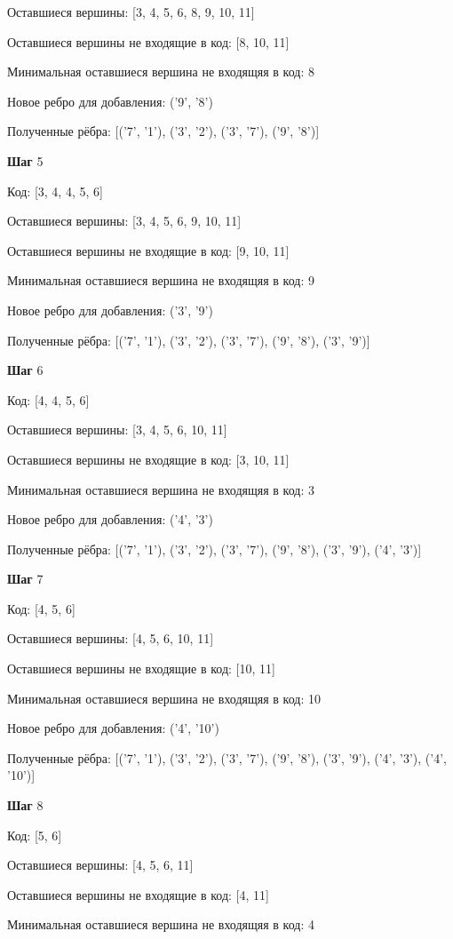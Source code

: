 Оставшиеся вершины: [3, 4, 5, 6, 8, 9, 10, 11]

Оставшиеся вершины не входящие в код: [8, 10, 11]

Минимальная оставшиеся вершина не входящяя в код: 8

Новое ребро для добавления: ('9', '8')

Полученные рёбра: [('7', '1'), ('3', '2'), ('3', '7'), ('9', '8')]


\textbf{Шаг} 5

Код: [3, 4, 4, 5, 6]

Оставшиеся вершины: [3, 4, 5, 6, 9, 10, 11]

Оставшиеся вершины не входящие в код: [9, 10, 11]

Минимальная оставшиеся вершина не входящяя в код: 9

Новое ребро для добавления: ('3', '9')

Полученные рёбра: [('7', '1'), ('3', '2'), ('3', '7'), ('9', '8'), ('3', '9')]


\textbf{Шаг} 6

Код: [4, 4, 5, 6]

Оставшиеся вершины: [3, 4, 5, 6, 10, 11]

Оставшиеся вершины не входящие в код: [3, 10, 11]

Минимальная оставшиеся вершина не входящяя в код: 3

Новое ребро для добавления: ('4', '3')

Полученные рёбра: [('7', '1'), ('3', '2'), ('3', '7'), ('9', '8'), ('3', '9'), ('4', '3')]


\textbf{Шаг} 7

Код: [4, 5, 6]

Оставшиеся вершины: [4, 5, 6, 10, 11]

Оставшиеся вершины не входящие в код: [10, 11]

Минимальная оставшиеся вершина не входящяя в код: 10

Новое ребро для добавления: ('4', '10')

Полученные рёбра: [('7', '1'), ('3', '2'), ('3', '7'), ('9', '8'), ('3', '9'), ('4', '3'), ('4', '10')]


\textbf{Шаг} 8

Код: [5, 6]

Оставшиеся вершины: [4, 5, 6, 11]

Оставшиеся вершины не входящие в код: [4, 11]

Минимальная оставшиеся вершина не входящяя в код: 4

